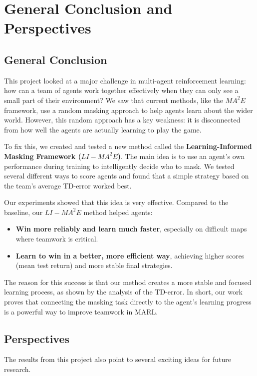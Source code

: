 \chapter{General Conclusion and Perspectives}
\label{chap:general_conclusion}

\section*{General Conclusion}

This project looked at a major challenge in multi-agent reinforcement learning: how can a team of agents work together effectively when they can only see a small part of their environment? We saw that current methods, like the ${MA}^2E$ framework, use a random masking approach to help agents learn about the wider world. However, this random approach has a key weakness: it is disconnected from how well the agents are actually learning to play the game.

To fix this, we created and tested a new method called the \textbf{Learning-Informed Masking Framework ($LI-{MA}^2E$)}. The main idea is to use an agent's own performance during training to intelligently decide who to mask. We tested several different ways to score agents and found that a simple strategy based on the team's average TD-error worked best.

Our experiments showed that this idea is very effective. Compared to the baseline, our $LI-{MA}^2E$ method helped agents:
\begin{itemize}
    \item \textbf{Win more reliably and learn much faster}, especially on difficult maps where teamwork is critical.
    \item \textbf{Learn to win in a better, more efficient way}, achieving higher scores (mean test return) and more stable final strategies.
\end{itemize}
The reason for this success is that our method creates a more stable and focused learning process, as shown by the analysis of the TD-error. In short, our work proves that connecting the masking task directly to the agent's learning progress is a powerful way to improve teamwork in MARL.

\section*{Perspectives}

The results from this project also point to several exciting ideas for future research.

